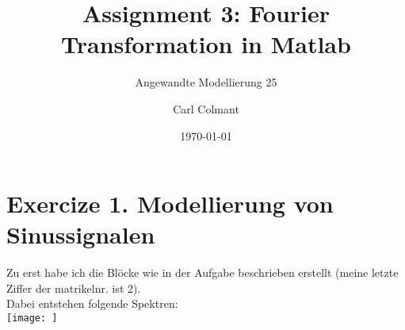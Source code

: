 \documentclass{scrartcl}
\title{Assignment 3: Fourier Transformation in Matlab}
\subtitle{Angewandte Modellierung 25}
\author{Carl Colmant}
\date{\today}
\begin{document}
\maketitle
\section*{Exercize 1. Modellierung von Sinussignalen}
Zu erst habe ich die Blöcke wie in der Aufgabe beschrieben erstellt (meine letzte Ziffer der matrikelnr. ist 2).\\
Dabei entstehen folgende Spektren:\\
\texttt{[image: ]} 
\end{document}
